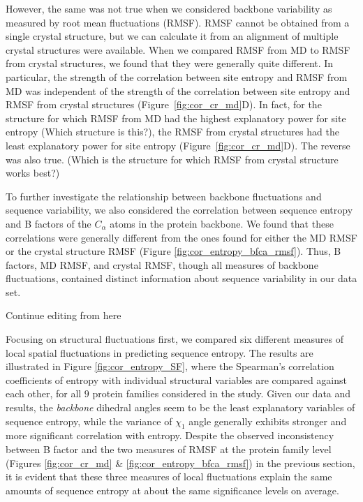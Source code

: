 \documentclass[12pt]{article}
\begin{document}
However, the same was not true when we considered backbone variability as measured by root mean fluctuations (RMSF). RMSF cannot be obtained from a single crystal structure, but we can calculate it from an alignment of multiple crystal structures were available. When we compared RMSF from MD to RMSF from crystal structures, we found that they were generally quite different. In particular, the strength of the correlation between site entropy and RMSF from MD was independent of the strength of the correlation between site entropy and RMSF from crystal structures (Figure~\ref{fig:cor_cr_md}D). In fact, for the structure for which RMSF from MD had the highest explanatory power for site entropy {\color{red}(Which structure is this?)}, the RMSF from crystal structures had the least explanatory power for site entropy (Figure~\ref{fig:cor_cr_md}D). The reverse was also true. {\color{red}(Which is the structure for which RMSF from crystal structure works best?)}

To further investigate the relationship between backbone fluctuations and sequence variability, we also considered the correlation between sequence entropy and B factors of the $C_\alpha$ atoms in the protein backbone. We found that these correlations were generally different from the ones found for either the MD RMSF or the crystal structure RMSF (Figure \ref{fig:cor_entropy_bfca_rmsf}). Thus, B factors, MD RMSF, and crystal RMSF, though all measures of backbone fluctuations, contained distinct information about sequence variability in our data set.

{\color{blue}Continue editing from here}

Focusing on structural fluctuations first, we compared six different measures of local spatial fluctuations in predicting sequence entropy. The results are illustrated in Figure \ref{fig:cor_entropy_SF}, where the Spearman's correlation coefficients of entropy with individual structural variables are compared against each other, for all $9$ protein families considered in the study. Given our data and results, the {\it backbone} dihedral angles seem to be the least explanatory variables of sequence entropy, while the variance of $\chi_1$ angle generally exhibits stronger and more significant correlation with entropy. Despite the observed inconsistency between B factor and the two measures of RMSF at the protein family level (Figures \ref{fig:cor_cr_md} \& \ref{fig:cor_entropy_bfca_rmsf}) in the previous section, it is evident that these three measures of local fluctuations explain the same amounts of sequence entropy at about the same significance levels on average.
\end{document}
